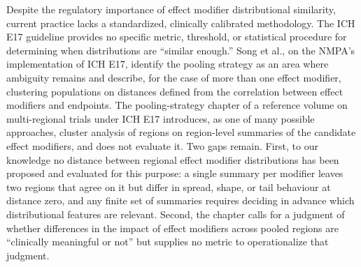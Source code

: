 \documentclass[AMA,Times1COL]{WileyNJDv5}
\begin{document}

Despite the regulatory importance of effect modifier distributional similarity, current practice lacks a standardized, clinically calibrated methodology. The ICH E17 guideline provides no specific metric, threshold, or statistical procedure for determining when distributions are ``similar enough.''\cite{iche17} Song et al., on the NMPA's implementation of ICH E17, identify the pooling strategy as an area where ambiguity remains and describe, for the case of more than one effect modifier, clustering populations on distances defined from the correlation between effect modifiers and endpoints.\cite{song2025} The pooling-strategy chapter of a reference volume on multi-regional trials under ICH E17 introduces, as one of many possible approaches, cluster analysis of regions on region-level summaries of the candidate effect modifiers, and does not evaluate it.\cite{komiyama2024} Two gaps remain. First, to our knowledge no distance between regional effect modifier distributions has been proposed and evaluated for this purpose: a single summary per modifier leaves two regions that agree on it but differ in spread, shape, or tail behaviour at distance zero, and any finite set of summaries requires deciding in advance which distributional features are relevant. Second, the chapter calls for a judgment of whether differences in the impact of effect modifiers across pooled regions are ``clinically meaningful or not''\cite{komiyama2024} but supplies no metric to operationalize that judgment.
\end{document}
